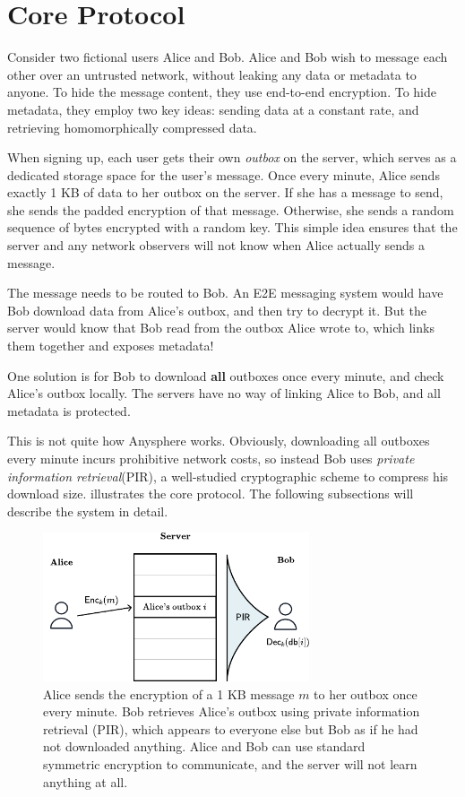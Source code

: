 \section{Core Protocol}
\label{sec:coreprotocol}

Consider two fictional users Alice and Bob. Alice and Bob wish to message each other over an untrusted network, without leaking any data or metadata to anyone. To hide the message content, they use end-to-end encryption. To hide metadata, they employ two key ideas: sending data at a constant rate, and retrieving homomorphically compressed data.

When signing up, each user gets their own \textit{outbox} on the server, which serves as a dedicated storage space for the user's message. Once every minute, Alice sends exactly 1 KB of data to her outbox on the server. If she has a message to send, she sends the padded encryption of that message. Otherwise, she sends a random sequence of bytes encrypted with a random key. This simple idea ensures that the server and any network observers will not know when Alice actually sends a message.

The message needs to be routed to Bob. An E2E messaging system would have Bob download data from Alice's outbox, and then try to decrypt it. But the server would know that Bob read from the outbox Alice wrote to, which links them together and exposes metadata!

One solution is for Bob to download \textbf{all} outboxes once every minute, and check Alice's outbox locally. The servers have no way of linking Alice to Bob, and all metadata is protected.

This is not quite how Anysphere works. Obviously, downloading all outboxes every minute incurs prohibitive network costs, so instead Bob uses \textit{private information retrieval}(PIR), a well-studied cryptographic scheme to compress his download size.  illustrates the core protocol. The following subsections will describe the system in detail.

\begin{figure}
    \centering
    \includegraphics[width=0.7\textwidth]{pirfigure.pdf}
\caption{Alice sends the encryption of a 1 KB message $m$ to her outbox once every minute. Bob retrieves Alice's outbox using private information retrieval (PIR), which appears to everyone else but Bob as if he had not downloaded anything. Alice and Bob can use standard symmetric encryption to communicate, and the server will not learn anything at all.}
\label{fig:highlevelpir}
\end{figure}



